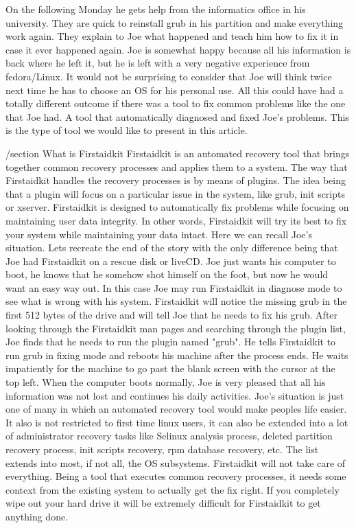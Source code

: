 On the following Monday he gets help from the informatics office in his university.  They are quick to reinstall grub in his partition and make everything work again.  They explain to Joe what happened and teach him how to fix it in case it ever happened again.  Joe is somewhat happy because all his information is back where he left it, but he is left with a very negative experience from fedora/Linux.  It would not be surprising to consider that Joe will think twice next time he has to choose an OS for his personal use.  All this could have had a totally different outcome if there was a tool to fix common problems like the one that Joe had.  A tool that automatically diagnosed and fixed Joe's problems.  This is the type of tool we would like to present in this article.

/section{ What is Firstaidkit }
Firstaidkit is an automated recovery tool that brings together common recovery processes and applies them to a system.  The way that Firstaidkit handles the recovery processes is by means of plugins.  The idea being that a plugin will focus on a particular issue in the system, like grub, init scripts or xserver.  Firstaidkit is designed to automatically fix problems while focusing on maintaining user data integrity.  In other words, Firstaidkit will try its best to fix your system while maintaining your data intact.
Here we can recall Joe's situation.  Lets recreate the end of the story with the only difference being that Joe had Firstaidkit on a rescue disk or liveCD.  Joe just wants his computer to boot, he knows that he somehow shot himself on the foot, but now he would want an easy way out.  In this case Joe may run Firstaidkit in diagnose mode to see what is wrong with his system.  Firstaidkit will notice the missing grub in the first 512 bytes of the drive and will tell Joe that he needs to fix his grub.  After looking through the Firstaidkit man pages and searching through the plugin list, Joe finds that he needs to run the plugin named "grub".  He tells Firstaidkit to run grub in fixing mode and reboots his machine after the process ends.  He waits impatiently for the machine to go past the blank screen with the cursor at the top left.  When the computer boots normally, Joe is very pleased that all his information was not lost and continues his daily activities.
Joe's situation is just one of many in which an automated recovery tool would make peoples life easier.  It also is not restricted to first time linux users, it can also be extended into a lot of administrator recovery tasks like Selinux analysis process, deleted partition recovery process, init scripts recovery, rpm database recovery, etc.  The list extends into most, if not all, the OS subsystems.
Firstaidkit will not take care of everything.  Being a tool that executes common recovery processes, it needs some context from the existing system to actually get the fix right.  If you completely wipe out your hard drive it will be extremely difficult for Firstaidkit to get anything done.

